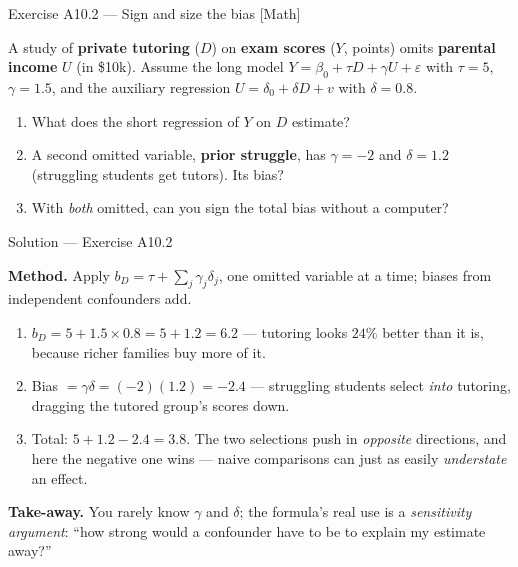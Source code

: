\documentclass[aspectratio=169,11pt]{beamer}
\begin{document}
\begin{frame}{Exercise A10.2 --- Sign and size the bias [Math]}
  \begin{exercise}
    A study of \textbf{private tutoring} ($D$) on \textbf{exam scores} ($Y$, points)
    omits \textbf{parental income} $U$ (in \$10k). Assume the long model
    $Y = \beta_0 + \tau D + \gamma U + \varepsilon$ with $\tau = 5$, $\gamma = 1.5$,
    and the auxiliary regression $U = \delta_0 + \delta D + v$ with $\delta = 0.8$.
    \begin{enumerate}
      \item What does the short regression of $Y$ on $D$ estimate?
      \item A second omitted variable, \textbf{prior struggle}, has $\gamma = -2$
            and $\delta = 1.2$ (struggling students get tutors). Its bias?
      \item With \emph{both} omitted, can you sign the total bias without a computer?
    \end{enumerate}
  \end{exercise}
\end{frame}

\begin{frame}{Solution --- Exercise A10.2}
  \begin{solutionbox}
    \footnotesize
    \textbf{Method.} Apply $b_D = \tau + \sum_j \gamma_j \delta_j$, one omitted
    variable at a time; biases from independent confounders add.
    \begin{enumerate}
      \item $b_D = 5 + 1.5 \times 0.8 = 5 + 1.2 = \mathbf{6.2}$ --- tutoring looks
            $24\%$ better than it is, because richer families buy more of it.
      \item Bias $= \gamma\delta = (-2)(1.2) = \mathbf{-2.4}$ --- struggling students
            select \emph{into} tutoring, dragging the tutored group's scores down.
      \item Total: $5 + 1.2 - 2.4 = \mathbf{3.8}$. The two selections push in
            \emph{opposite} directions, and here the negative one wins --- naive
            comparisons can just as easily \emph{understate} an effect.
    \end{enumerate}
    \textbf{Take-away.} You rarely know $\gamma$ and $\delta$; the formula's real use
    is a \emph{sensitivity argument}: ``how strong would a confounder have to be to
    explain my estimate away?''
  \end{solutionbox}
\end{frame}
\end{document}
